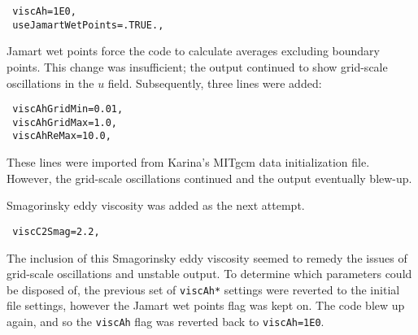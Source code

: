 \documentclass[11pt]{article}
\begin{document}
\begin{lstlisting}
 viscAh=1E0,
 useJamartWetPoints=.TRUE.,
\end{lstlisting}

Jamart wet points force the code to calculate averages excluding boundary points. This change was insufficient; the output continued to show grid-scale oscillations in the $u$ field. Subsequently, three lines were added:

\begin{lstlisting}
 viscAhGridMin=0.01,
 viscAhGridMax=1.0,
 viscAhReMax=10.0,
\end{lstlisting}

These lines were imported from Karina's MITgcm data initialization file. However, the grid-scale oscillations continued and the output eventually blew-up. 

Smagorinsky eddy viscosity was added as the next attempt.

\begin{lstlisting}
 viscC2Smag=2.2,
\end{lstlisting}

The inclusion of this Smagorinsky eddy viscosity seemed to remedy the issues of grid-scale oscillations and unstable output. To determine which parameters could be disposed of, the previous set of \texttt{viscAh*} settings were reverted to the initial file settings, however the Jamart wet points flag was kept on. The code blew up again, and so the \texttt{viscAh} flag was reverted back to \texttt{viscAh=1E0}.




\end{document}
